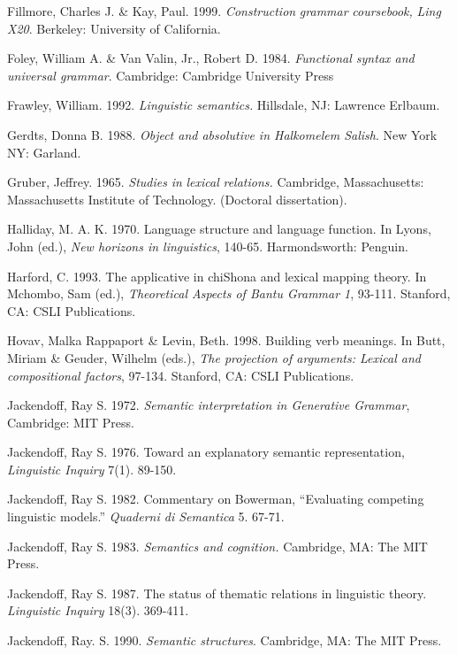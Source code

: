 Fillmore, Charles J. \& Kay, Paul. 1999. \textit{Cons}\textit{t}\textit{r}\textit{u}\textit{c}\textit{ti}\textit{o}\textit{n}\textit{ }\textit{gra}\textit{mm}\textit{ar}\textit{ }\textit{co}\textit{u}\textit{rseboo}\textit{k,}\textit{ }\textit{Li}\textit{n}\textit{g}\textit{ }\textit{X20}. Berkeley: University of California.

Foley, William A. \& Van Valin, Jr., Robert D. 1984. \textit{Functional syntax and universal grammar}. Cambridge: Cambridge University Press

Frawley, William. 1992. \textit{Linguistic semantics.} Hillsdale, NJ: Lawrence Erlbaum.

Gerdts, Donna B. 1988. \textit{Object and absolutive in Halkomelem Salish}. New York NY: Garland.

Gruber, Jeffrey. 1965. \textit{Studies}\textit{ }\textit{in}\textit{ }\textit{lexical}\textit{ }\textit{relations. }Cambridge, Massachusetts: Massachusetts Institute of Technology. (Doctoral dissertation).

Halliday, M. A. K. 1970. Language structure and language function. In Lyons, John (ed.), \textit{New horizons in linguistics}, 140-65. Harmondsworth: Penguin.

Harford, C. 1993. The applicative in chiShona and lexical mapping theory. In Mchombo, Sam (ed.), \textit{Theoretical Aspects of Bantu Grammar 1}, 93-111. Stanford, CA: CSLI Publications.

Hovav, Malka Rappaport \& Levin, Beth. 1998. Building verb meanings. In Butt, Miriam \& Geuder, Wilhelm (eds.), \textit{The projection of arguments: Lexical and compositional factors}, 97-134. Stanford, CA: CSLI Publications.

Jackendoff, Ray S. 1972. \textit{Semantic interpretation in Generative Grammar}, Cambridge: MIT Press.

Jackendoff, Ray S. 1976. Toward an explanatory semantic representation, \textit{Linguistic Inquiry }7(1). 89-150.

Jackendoff, Ray S. 1982. Commentary on Bowerman, “Evaluating competing   linguistic models.” \textit{Quaderni di Semantica }5. 67-71.

Jackendoff, Ray S. 1983. \textit{Semantics and cognition.} Cambridge, MA: The MIT Press.

Jackendoff, Ray S. 1987. The status of thematic relations in linguistic theory. \textit{Linguistic Inquiry }18(3). 369-411.

Jackendoff, Ray. S. 1990. \textit{Semantic structures}. Cambridge, MA: The MIT Press.

